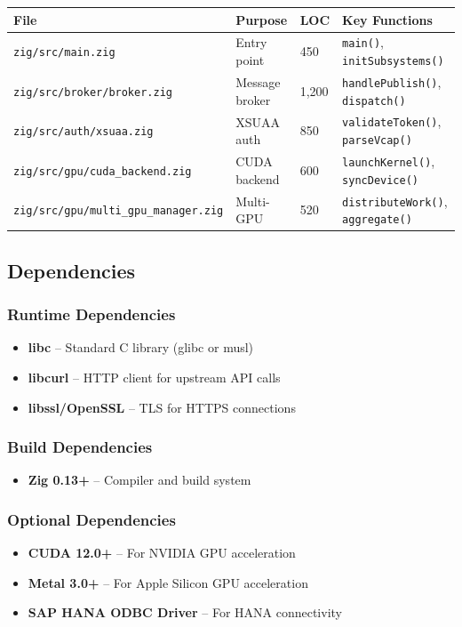 \documentclass[11pt,a4paper]{article}
\begin{document}
\begin{tabular}{@{}L{5.5cm}L{3cm}L{1.5cm}L{3.5cm}@{}}
\toprule
\textbf{File} & \textbf{Purpose} & \textbf{LOC} & \textbf{Key Functions} \\
\midrule
\texttt{zig/src/main.zig} & Entry point & 450 & \texttt{main()}, \texttt{initSubsystems()} \\
\texttt{zig/src/broker/broker.zig} & Message broker & 1,200 & \texttt{handlePublish()}, \texttt{dispatch()} \\
\texttt{zig/src/auth/xsuaa.zig} & XSUAA auth & 850 & \texttt{validateToken()}, \texttt{parseVcap()} \\
\texttt{zig/src/gpu/cuda\_backend.zig} & CUDA backend & 600 & \texttt{launchKernel()}, \texttt{syncDevice()} \\
\texttt{zig/src/gpu/multi\_gpu\_manager.zig} & Multi-GPU & 520 & \texttt{distributeWork()}, \texttt{aggregate()} \\
\bottomrule
\end{tabular}

\subsection{Dependencies}

\subsubsection{Runtime Dependencies}
\begin{itemize}[noitemsep]
    \item \textbf{libc} -- Standard C library (glibc or musl)
    \item \textbf{libcurl} -- HTTP client for upstream API calls
    \item \textbf{libssl/OpenSSL} -- TLS for HTTPS connections
\end{itemize}

\subsubsection{Build Dependencies}
\begin{itemize}[noitemsep]
    \item \textbf{Zig 0.13+} -- Compiler and build system
\end{itemize}

\subsubsection{Optional Dependencies}
\begin{itemize}[noitemsep]
    \item \textbf{CUDA 12.0+} -- For NVIDIA GPU acceleration
    \item \textbf{Metal 3.0+} -- For Apple Silicon GPU acceleration
    \item \textbf{SAP HANA ODBC Driver} -- For HANA connectivity
\end{itemize}
\end{document}
